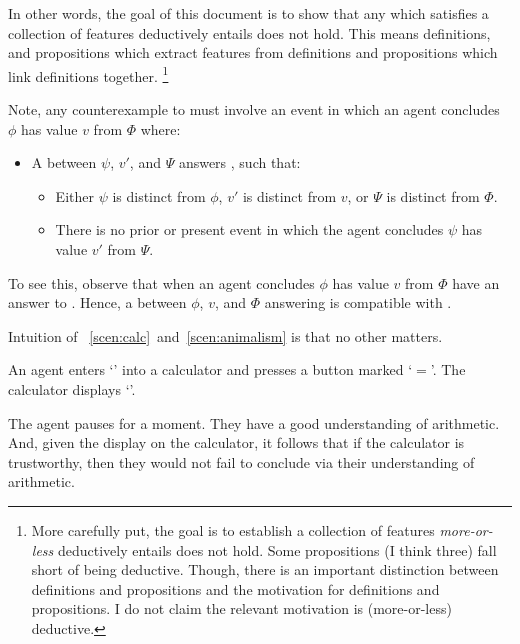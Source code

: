 \begin{note}
  In other words, the goal of this document is to show that any  which satisfies a collection of features deductively entails \issueInclusion{} does not hold.
  This means definitions, and propositions which extract features from definitions and propositions which link definitions together.%
  \footnote{
    More carefully put, the goal is to establish a collection of features \emph{more-or-less} deductively entails \issueInclusion{} does not hold.
    Some propositions (I think three) fall short of being deductive.
    Though, there is an important distinction between definitions and propositions and the motivation for definitions and propositions.
    I do not claim the relevant motivation is (more-or-less) deductive.
  }
\end{note}

\begin{note}
  Note, any counterexample to \issueInclusion{} must involve an event in which an agent concludes \(\phi\) has value \(v\) from \(\Phi\) where:
  \begin{itemize}
  \item
    A \ros{} between \(\psi\), \(v'\), and \(\Psi\) answers \qWhy{}, such that:
    \begin{itemize}
    \item
      Either \(\psi\) is distinct from \(\phi\), \(v'\) is distinct from \(v\), or \(\Psi\) is distinct from \(\Phi\).
    \item
      There is no prior or present event in which the agent concludes \(\psi\) has value \(v'\) from \(\Psi\).
    \end{itemize}
  \end{itemize}
  To see this, observe that when an agent concludes \(\phi\) has value \(v\) from \(\Phi\) have an answer to \qHow{}.
  Hence, a \ros{} between \(\phi\), \(v\), and \(\Phi\) answering \qWhy{} is compatible with \issueInclusion{}.

  Intuition of ~\ref{scen:calc}~and~\ref{scen:animalism} is that no other \ros{} matters.

  \begin{scenario}[Multiplication]%
    \label{scen:calc:var}%
    An agent enters `\gistCalcLHS{}' into a calculator and presses a button marked `\(=\)'.
    The calculator displays `\gistCalcRHS{}'.

    The agent pauses for a moment.
    They have a good understanding of arithmetic.
    And, given the display on the calculator, it follows that if the calculator is trustworthy, then they would not fail to conclude \propM{\gistCalcEq{}} via their understanding of arithmetic.


\end{scenario}
\end{note}
